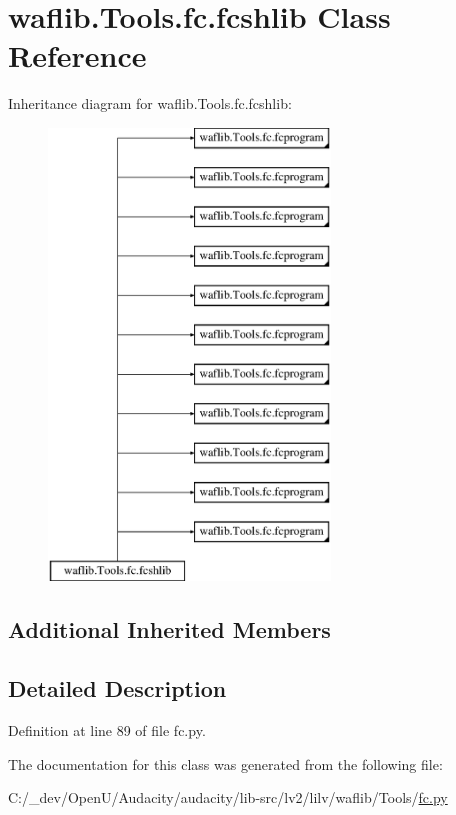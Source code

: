 \hypertarget{classwaflib_1_1_tools_1_1fc_1_1fcshlib}{}\section{waflib.\+Tools.\+fc.\+fcshlib Class Reference}
\label{classwaflib_1_1_tools_1_1fc_1_1fcshlib}
Inheritance diagram for waflib.\+Tools.\+fc.\+fcshlib\+:\begin{figure}[H]
\begin{center}
\leavevmode
\includegraphics[height=12.000000cm]{classwaflib_1_1_tools_1_1fc_1_1fcshlib}
\end{center}
\end{figure}
\subsection*{Additional Inherited Members}


\subsection{Detailed Description}


Definition at line 89 of file fc.\+py.



The documentation for this class was generated from the following file\+:\begin{DoxyCompactItemize}
\item 
C\+:/\+\_\+dev/\+Open\+U/\+Audacity/audacity/lib-\/src/lv2/lilv/waflib/\+Tools/\hyperlink{lilv_2waflib_2_tools_2fc_8py}{fc.\+py}\end{DoxyCompactItemize}
